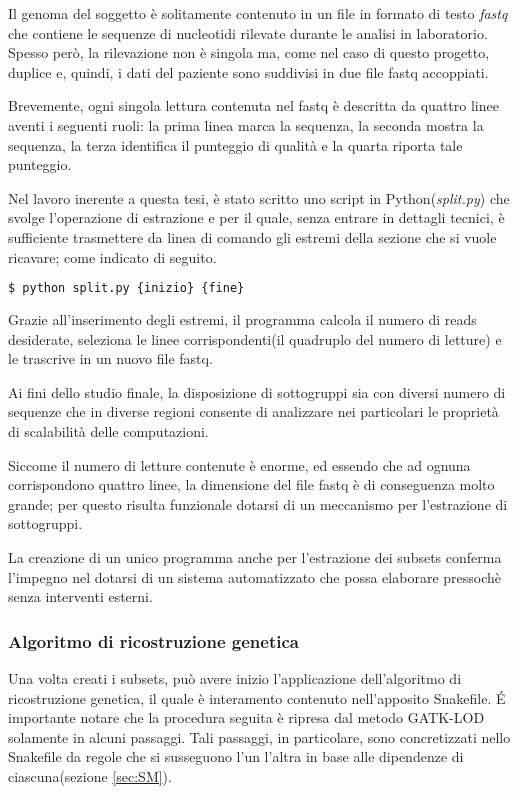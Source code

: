 Il genoma del soggetto è solitamente contenuto in un file in formato di testo \textit{fastq} che contiene le sequenze di nucleotidi rilevate durante le analisi in laboratorio.
Spesso però, la rilevazione non è singola ma, come nel caso di questo progetto, duplice e, quindi, i dati del paziente sono suddivisi in due file fastq accoppiati.

Brevemente, ogni singola lettura contenuta nel fastq è descritta da quattro linee aventi i seguenti ruoli: la prima linea marca la sequenza, la seconda mostra la sequenza, la terza identifica il punteggio di qualità e la quarta riporta tale punteggio.


Nel lavoro inerente a questa tesi, è stato scritto uno script in Python(\textit{split.py}) che svolge l'operazione di estrazione e per il quale, senza entrare in dettagli tecnici, è sufficiente trasmettere da linea di comando gli estremi della sezione che si vuole ricavare; come indicato di seguito.
\begin{lstlisting}[language=Python]
$ python split.py {inizio} {fine}
\end{lstlisting}
Grazie all'inserimento degli estremi, il programma calcola il numero di reads desiderate, seleziona le linee corrispondenti(il quadruplo del numero di letture) e le trascrive in un nuovo file fastq.

Ai fini dello studio finale, la disposizione di sottogruppi sia con diversi numero di sequenze che in diverse regioni consente di analizzare nei particolari le proprietà di scalabilità delle computazioni.

Siccome il numero di letture contenute è enorme, ed essendo che ad ognuna corrispondono quattro linee, la dimensione del file fastq è di conseguenza molto grande; per questo risulta funzionale dotarsi di un meccanismo per l'estrazione di sottogruppi.

La creazione di un unico programma anche per l'estrazione dei subsets conferma l'impegno nel dotarsi di un sistema automatizzato che possa elaborare pressochè senza interventi esterni.


\subsubsection{Algoritmo di ricostruzione genetica}
Una volta creati i subsets, può avere inizio l'applicazione dell'algoritmo di ricostruzione genetica, il quale è interamento contenuto nell'apposito Snakefile.
\'E importante notare che la procedura seguita è ripresa dal metodo GATK-LOD solamente in alcuni passaggi.
Tali passaggi, in particolare, sono concretizzati nello Snakefile da regole che si susseguono l'un l'altra in base alle dipendenze di ciascuna(sezione \ref{sec:SM}).

